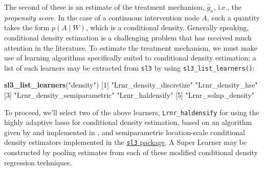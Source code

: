 \documentclass[12pt, krantz2,]{krantz}
\newenvironment{Shaded}{\begin{snugshade}}{\end{snugshade}}
\newcommand{\CommentTok}[1]{\textcolor[rgb]{0.37,0.37,0.37}{\textit{#1}}}
\newcommand{\DataTypeTok}[1]{\textcolor[rgb]{0.27,0.27,0.27}{#1}}
\newcommand{\DecValTok}[1]{\textcolor[rgb]{0.06,0.06,0.06}{#1}}
\newcommand{\KeywordTok}[1]{\textcolor[rgb]{0.27,0.27,0.27}{\textbf{#1}}}
\newcommand{\NormalTok}[1]{#1}
\newcommand{\OperatorTok}[1]{\textcolor[rgb]{0.43,0.43,0.43}{\textbf{#1}}}
\newcommand{\StringTok}[1]{\textcolor[rgb]{0.5,0.5,0.5}{#1}}
\theoremstyle{definition}
\theoremstyle{definition}
\theoremstyle{definition}
\newcommand{\1}{\mathbbm{1}}
\begin{document}
\begin{Shaded}
\end{Shaded}

The second of these is an estimate of the treatment mechanism, \(\hat{g}_n\),
i.e., the \emph{propensity score}. In the case of a continuous intervention node \(A\),
such a quantity takes the form \(p(A \mid W)\), which is a conditional density.
Generally speaking, conditional density estimation is a challenging problem that
has received much attention in the literature. To estimate the treatment
mechanism, we must make use of learning algorithms specifically suited to
conditional density estimation; a list of such learners may be extracted from
\texttt{sl3} by using \texttt{sl3\_list\_learners()}:

\begin{Shaded}
\begin{Highlighting}[]
\KeywordTok{sl3_list_learners}\NormalTok{(}\StringTok{"density"}\NormalTok{)}
\NormalTok{[}\DecValTok{1}\NormalTok{] }\StringTok{"Lrnr_density_discretize"}     \StringTok{"Lrnr_density_hse"}           
\NormalTok{[}\DecValTok{3}\NormalTok{] }\StringTok{"Lrnr_density_semiparametric"} \StringTok{"Lrnr_haldensify"}            
\NormalTok{[}\DecValTok{5}\NormalTok{] }\StringTok{"Lrnr_solnp_density"}         
\end{Highlighting}
\end{Shaded}

To proceed, we'll select two of the above learners, \texttt{Lrnr\_haldensify} for using
the highly adaptive lasso for conditional density estimation, based on an
algorithm given by \citet{diaz2011super} and implemented in \citet{hejazi2020haldensify}, and
semiparametric location-scale conditional density estimators implemented in the
\href{https://github.com/tlverse/sl3}{\texttt{sl3} package}. A Super Learner may be
constructed by pooling estimates from each of these modified conditional density
regression techniques.
\end{document}
